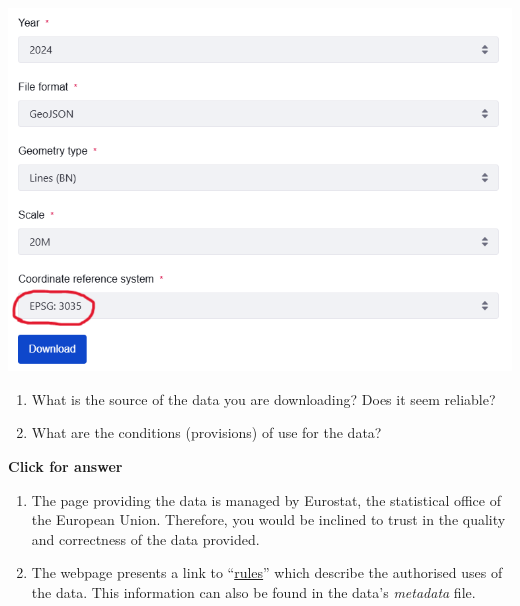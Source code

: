 \documentclass[
  letterpaper,
  DIV=11,
  numbers=noendperiod]{scrreprt}
\begin{document}
\includegraphics{images/lab_2/lab2_fig1_eurostat_3035.png}

\begin{tcolorbox}[enhanced jigsaw, coltitle=black, toprule=.15mm, breakable, opacitybacktitle=0.6, left=2mm, colback=white, leftrule=.75mm, rightrule=.15mm, colbacktitle=quarto-callout-important-color!10!white, toptitle=1mm, titlerule=0mm, colframe=quarto-callout-important-color-frame, arc=.35mm, bottomtitle=1mm, opacityback=0, bottomrule=.15mm, title=\textcolor{quarto-callout-important-color}{\faExclamation}\hspace{0.5em}{Stop and Think}]

\begin{enumerate}
\def\labelenumi{\alph{enumi})}
\item
  What is the source of the data you are downloading? Does it seem
  reliable?
\item
  What are the conditions (provisions) of use for the data?
\end{enumerate}

\end{tcolorbox}

\begin{tcolorbox}[enhanced jigsaw, toprule=.15mm, breakable, left=2mm, colframe=quarto-callout-important-color-frame, colback=white, arc=.35mm, leftrule=.75mm, opacityback=0, rightrule=.15mm, bottomrule=.15mm]

\vspace{-3mm}\textbf{Click for answer}\vspace{3mm}

\begin{enumerate}
\def\labelenumi{\alph{enumi})}
\item
  The page providing the data is managed by Eurostat, the statistical
  office of the European Union. Therefore, you would be inclined to
  trust in the quality and correctness of the data provided.
\item
  The webpage presents a link to
  ``\href{https://ec.europa.eu/eurostat/web/gisco/geodata/administrative-units}{rules}''
  which describe the authorised uses of the data. This information can
  also be found in the data's \emph{metadata} file.
\end{enumerate}

\end{tcolorbox}
\end{document}
